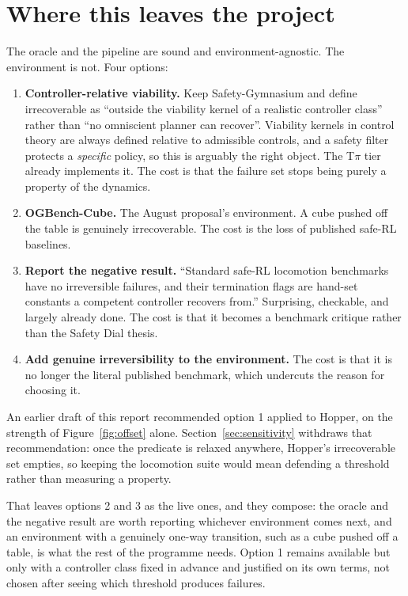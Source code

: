 \documentclass[11pt,a4paper]{article}
\begin{document}
\section{Where this leaves the project}

The oracle and the pipeline are sound and environment-agnostic. The environment is not. Four
options:

\begin{enumerate}
  \item \textbf{Controller-relative viability.} Keep Safety-Gymnasium and define irrecoverable as
    ``outside the viability kernel of a realistic controller class'' rather than ``no omniscient
    planner can recover''. Viability kernels in control theory are always defined relative to
    admissible controls, and a safety filter protects a \emph{specific} policy, so this is
    arguably the right object. The T$\pi$ tier already implements it. The cost is that the failure
    set stops being purely a property of the dynamics.
  \item \textbf{OGBench-Cube.} The August proposal's environment. A cube pushed off the table is
    genuinely irrecoverable. The cost is the loss of published safe-RL baselines.
  \item \textbf{Report the negative result.} ``Standard safe-RL locomotion benchmarks have no
    irreversible failures, and their termination flags are hand-set constants a competent
    controller recovers from.'' Surprising, checkable, and largely already done. The cost is that
    it becomes a benchmark critique rather than the Safety Dial thesis.
  \item \textbf{Add genuine irreversibility to the environment.} The cost is that it is no longer
    the literal published benchmark, which undercuts the reason for choosing it.
\end{enumerate}

An earlier draft of this report recommended option 1 applied to Hopper, on the strength of
Figure~\ref{fig:offset} alone. Section~\ref{sec:sensitivity} withdraws that recommendation: once
the predicate is relaxed anywhere, Hopper's irrecoverable set empties, so keeping the locomotion
suite would mean defending a threshold rather than measuring a property.

That leaves options 2 and 3 as the live ones, and they compose: the oracle and the negative result
are worth reporting whichever environment comes next, and an environment with a genuinely
one-way transition, such as a cube pushed off a table, is what the rest of the programme needs.
Option 1 remains available but only with a controller class fixed in advance and justified on its
own terms, not chosen after seeing which threshold produces failures.
\end{document}
